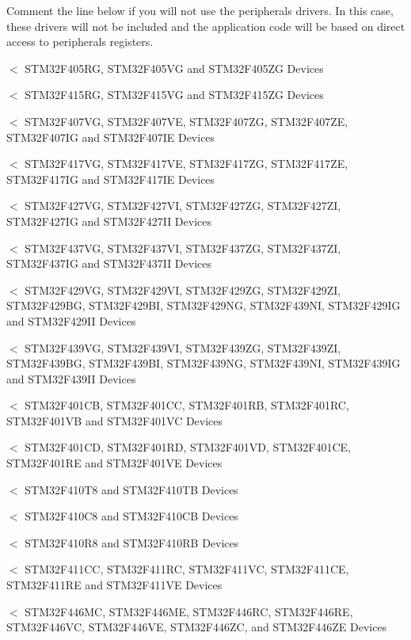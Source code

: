 Comment the line below if you will not use the peripherals drivers. In this case, these drivers will not be included and the application code will be based on direct access to peripherals registers. 

$<$ S\+T\+M32\+F405\+RG, S\+T\+M32\+F405\+VG and S\+T\+M32\+F405\+ZG Devices

$<$ S\+T\+M32\+F415\+RG, S\+T\+M32\+F415\+VG and S\+T\+M32\+F415\+ZG Devices

$<$ S\+T\+M32\+F407\+VG, S\+T\+M32\+F407\+VE, S\+T\+M32\+F407\+ZG, S\+T\+M32\+F407\+ZE, S\+T\+M32\+F407\+IG and S\+T\+M32\+F407\+IE Devices

$<$ S\+T\+M32\+F417\+VG, S\+T\+M32\+F417\+VE, S\+T\+M32\+F417\+ZG, S\+T\+M32\+F417\+ZE, S\+T\+M32\+F417\+IG and S\+T\+M32\+F417\+IE Devices

$<$ S\+T\+M32\+F427\+VG, S\+T\+M32\+F427\+VI, S\+T\+M32\+F427\+ZG, S\+T\+M32\+F427\+ZI, S\+T\+M32\+F427\+IG and S\+T\+M32\+F427\+II Devices

$<$ S\+T\+M32\+F437\+VG, S\+T\+M32\+F437\+VI, S\+T\+M32\+F437\+ZG, S\+T\+M32\+F437\+ZI, S\+T\+M32\+F437\+IG and S\+T\+M32\+F437\+II Devices

$<$ S\+T\+M32\+F429\+VG, S\+T\+M32\+F429\+VI, S\+T\+M32\+F429\+ZG, S\+T\+M32\+F429\+ZI, S\+T\+M32\+F429\+BG, S\+T\+M32\+F429\+BI, S\+T\+M32\+F429\+NG, S\+T\+M32\+F439\+NI, S\+T\+M32\+F429\+IG and S\+T\+M32\+F429\+II Devices

$<$ S\+T\+M32\+F439\+VG, S\+T\+M32\+F439\+VI, S\+T\+M32\+F439\+ZG, S\+T\+M32\+F439\+ZI, S\+T\+M32\+F439\+BG, S\+T\+M32\+F439\+BI, S\+T\+M32\+F439\+NG, S\+T\+M32\+F439\+NI, S\+T\+M32\+F439\+IG and S\+T\+M32\+F439\+II Devices

$<$ S\+T\+M32\+F401\+CB, S\+T\+M32\+F401\+CC, S\+T\+M32\+F401\+RB, S\+T\+M32\+F401\+RC, S\+T\+M32\+F401\+VB and S\+T\+M32\+F401\+VC Devices

$<$ S\+T\+M32\+F401\+CD, S\+T\+M32\+F401\+RD, S\+T\+M32\+F401\+VD, S\+T\+M32\+F401\+CE, S\+T\+M32\+F401\+RE and S\+T\+M32\+F401\+VE Devices

$<$ S\+T\+M32\+F410\+T8 and S\+T\+M32\+F410\+TB Devices

$<$ S\+T\+M32\+F410\+C8 and S\+T\+M32\+F410\+CB Devices

$<$ S\+T\+M32\+F410\+R8 and S\+T\+M32\+F410\+RB Devices

$<$ S\+T\+M32\+F411\+CC, S\+T\+M32\+F411\+RC, S\+T\+M32\+F411\+VC, S\+T\+M32\+F411\+CE, S\+T\+M32\+F411\+RE and S\+T\+M32\+F411\+VE Devices

$<$ S\+T\+M32\+F446\+MC, S\+T\+M32\+F446\+ME, S\+T\+M32\+F446\+RC, S\+T\+M32\+F446\+RE, S\+T\+M32\+F446\+VC, S\+T\+M32\+F446\+VE, S\+T\+M32\+F446\+ZC, and S\+T\+M32\+F446\+ZE Devices

